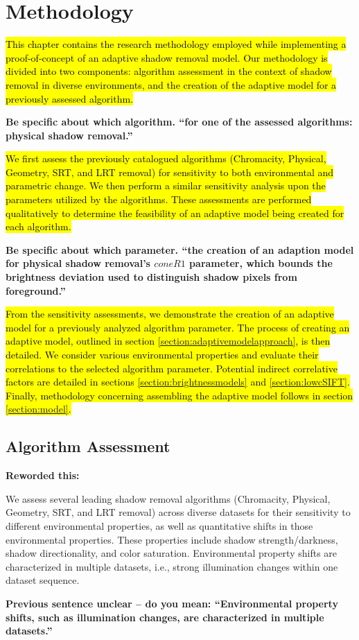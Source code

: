 \documentclass[12pt]{report}
\newcommand{\comment}[1]
           {\par {\bfseries \color{blue} #1 \par}}
\begin{document}
\doublespacing

\clearpage
\chapter{Methodology} \label{chapter:methodology}
\hl{This chapter contains the research methodology employed while implementing a proof-of-concept of an adaptive shadow removal model. Our methodology is divided into two components: algorithm assessment in the context of shadow removal in diverse environments, and the creation of the adaptive model for a previously assessed algorithm.}
\comment{Be specific about which algorithm. ``for one of the assessed algorithms: physical shadow removal.''}

\hl{We first assess the previously catalogued algorithms (Chromacity, Physical, Geometry, SRT, and LRT removal) for sensitivity to both environmental and parametric change. We then perform a similar sensitivity analysis upon the parameters utilized by the algorithms. These assessments are performed qualitatively to determine the feasibility of an adaptive model being created for each algorithm.} 

\comment{Be specific about which parameter. ``the creation of an adaption model for physical shadow removal's $coneR1$ parameter, which bounds the brightness deviation used to distinguish shadow pixels from foreground.''}
\hl{From the sensitivity assessments, we demonstrate the creation of an adaptive model for a previously analyzed algorithm parameter. The process of creating an  adaptive model, outlined in section \ref{section:adaptivemodelapproach}, is then detailed. We consider various environmental properties and evaluate their correlations to the selected algorithm parameter. Potential indirect correlative factors are detailed in sections \ref{section:brightnessmodels} and \ref{section:lowcSIFT}. Finally, methodology concerning assembling the adaptive model follows in section \ref{section:model}.}

\section{Algorithm Assessment}

\comment{Reworded this:}
We assess several leading shadow removal algorithms (Chromacity, Physical, Geometry, SRT, and LRT removal) across diverse datasets for their sensitivity to different environmental properties, as well as quantitative shifts in those environmental properties.  These properties include shadow strength/darkness, shadow directionality, and color saturation. Environmental property shifts are characterized in multiple datasets, i.e., strong illumination changes within one dataset sequence.
\comment{Previous sentence unclear -- do you mean: ``Environmental property shifts, such as illumination changes, are characterized in multiple datasets.''}
\end{document}
